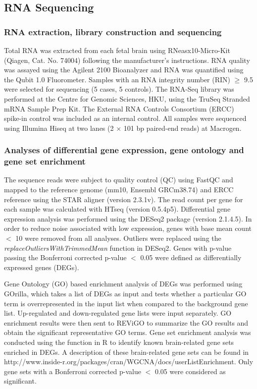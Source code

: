 \subsection{RNA Sequencing}
\subsubsection{RNA extraction, library construction and sequencing}
Total RNA was extracted from each fetal brain using RNeasx10-Micro-Kit (Qiagen, Cat. No. 74004) following the manufacturer’s instructions. 
RNA quality was assayed using the Agilent 2100 Bioanalyzer and RNA was quantified using the Qubit 1.0 Fluorometer. 
Samples with an RNA integrity number (RIN) $\ge$ 9.5 were selected for sequencing (5 cases, 5 controls). 
The RNA-Seq library was performed at the Centre for Genomic Sciences, HKU, using the TruSeq Stranded mRNA Sample Prep Kit. 
The External RNA Controls Consortium (ERCC) spike-in control\cite{Jiang2011} was included as an internal control. 
All samples were sequenced using Illumina Hiseq at two lanes (2 $\times$ 101 bp paired-end reads) at Macrogen.

\subsubsection{Analyses of differential gene expression, gene ontology and gene set enrichment}

The sequence reads were subject to quality control (QC) using FastQC \cite{SimonAndrews} and mapped to the  reference genome (mm10, Ensembl GRCm38.74) and ERCC reference using the STAR aligner (version 2.3.1v)\cite{Dobin2013}.
The read count per gene for each sample was calculated with HTseq (version 0.5.4p5)\cite{Anders.2011}.
Differential gene expression analysis was performed using the DESeq2 package (version 2.1.4.5)\cite{Anders2010}.
In order to reduce noise associated with low expression, genes with base mean count $<$ 10 were removed from all analyses.
Outliers were replaced using the \textit{replaceOutliersWithTrimmedMean} function in DESeq2\cite{Anders2010}. Genes with p-value passing the Bonferroni corrected p-value $<$ 0.05 were defined as differentially expressed genes (DEGs). 

Gene Ontology (GO) based enrichment analysis of DEGs was performed using GOrilla\cite{Eden2009}, which takes a list of DEGs as input and tests whether a particular GO term is overrepresented in the input list when compared to the background gene list.
Up-regulated and down-regulated gene lists were input separately.
GO enrichment results were then sent to REViGO\cite{Supek2011} to summarize the GO results and obtain the significant representative GO terms.
Gene set enrichment analysis was conducted using the \cite{Miller2011} function in R to identify known brain-related gene sets enriched in DEGs.
A description of these brain-related gene sets can be found in http://www.inside-r.org/packages/cran/WGCNA/docs/userListEnrichment.
Only gene sets with a Bonferroni corrected p-value $<$ 0.05 were considered as significant. 

